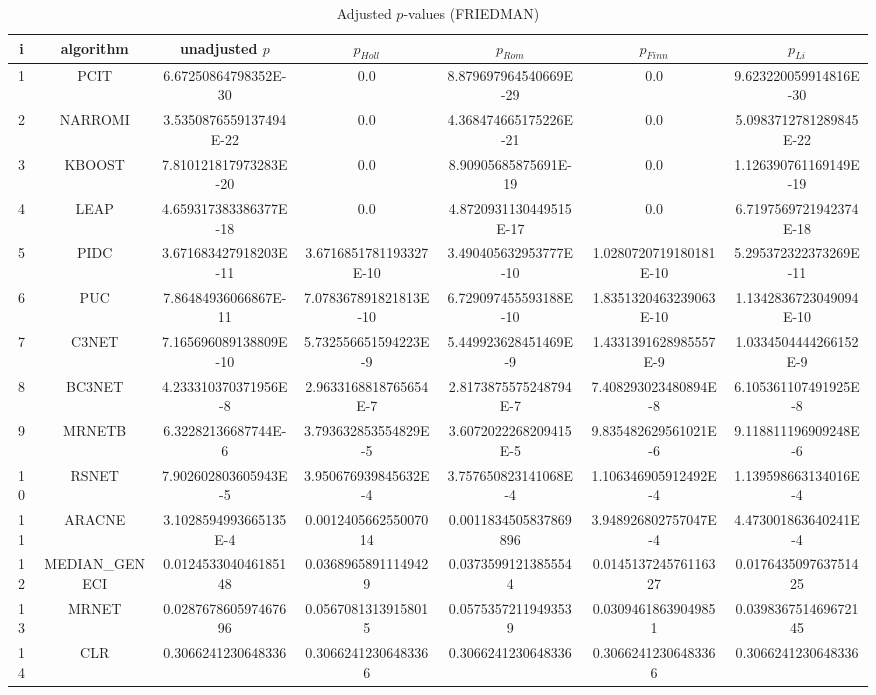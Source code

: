 \documentclass[a4paper,10pt]{article}
\begin{document}
\begin{landscape}
\begin{table}[!htp]
\centering\scriptsize
\caption{Adjusted $p$-values (FRIEDMAN)}
\begin{tabular}{ccccccc}
i&algorithm&unadjusted $p$&$p_{Holl}$&$p_{Rom}$&$p_{Finn}$&$p_{Li}$\\
\hline
1&PCIT&6.67250864798352E-30&0.0&8.879697964540669E-29&0.0&9.623220059914816E-30\\
2&NARROMI&3.5350876559137494E-22&0.0&4.368474665175226E-21&0.0&5.0983712781289845E-22\\
3&KBOOST&7.810121817973283E-20&0.0&8.90905685875691E-19&0.0&1.126390761169149E-19\\
4&LEAP&4.659317383386377E-18&0.0&4.8720931130449515E-17&0.0&6.7197569721942374E-18\\
5&PIDC&3.671683427918203E-11&3.6716851781193327E-10&3.490405632953777E-10&1.0280720719180181E-10&5.295372322373269E-11\\
6&PUC&7.86484936066867E-11&7.078367891821813E-10&6.729097455593188E-10&1.8351320463239063E-10&1.1342836723049094E-10\\
7&C3NET&7.165696089138809E-10&5.732556651594223E-9&5.449923628451469E-9&1.4331391628985557E-9&1.0334504444266152E-9\\
8&BC3NET&4.233310370371956E-8&2.9633168818765654E-7&2.8173875575248794E-7&7.408293023480894E-8&6.105361107491925E-8\\
9&MRNETB&6.32282136687744E-6&3.793632853554829E-5&3.6072022268209415E-5&9.835482629561021E-6&9.118811196909248E-6\\
10&RSNET&7.902602803605943E-5&3.950676939845632E-4&3.757650823141068E-4&1.106346905912492E-4&1.139598663134016E-4\\
11&ARACNE&3.1028594993665135E-4&0.001240566255007014&0.0011834505837869896&3.948926802757047E-4&4.473001863640241E-4\\
12&MEDIAN_GENECI&0.012453304046185148&0.03689658911149429&0.03735991213855544&0.014513724576116327&0.017643509763751425\\
13&MRNET&0.028767860597467696&0.05670813139158015&0.05753572119493539&0.03094618639049851&0.039836751469672145\\
14&CLR&0.3066241230648336&0.30662412306483366&0.3066241230648336&0.30662412306483366&0.3066241230648336\\
\hline
\end{tabular}
\end{table}


\newpage


\end{landscape}
\end{document}
